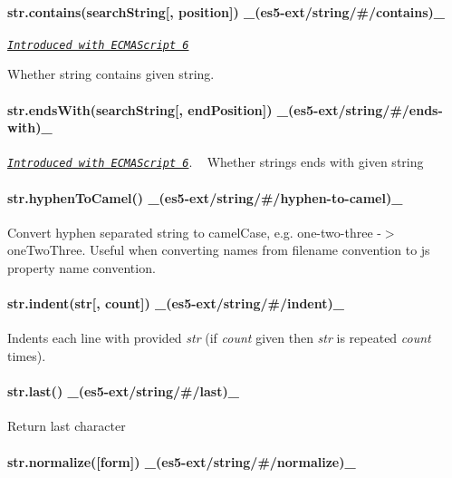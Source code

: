 \paragraph*{str.\+contains(search\+String\mbox{[}, position\mbox{]}) \+\_\+(es5-\/ext/string/\#/contains)\+\_\+}

\href{http://people.mozilla.org/~jorendorff/es6-draft.html#sec-string.prototype.contains}{\tt {\itshape Introduced with E\+C\+M\+A\+Script 6}}

Whether string contains given string.

\paragraph*{str.\+ends\+With(search\+String\mbox{[}, end\+Position\mbox{]}) \+\_\+(es5-\/ext/string/\#/ends-\/with)\+\_\+}

\href{http://people.mozilla.org/~jorendorff/es6-draft.html#sec-string.prototype.endswith}{\tt {\itshape Introduced with E\+C\+M\+A\+Script 6}}. ~\newline
Whether strings ends with given string

\paragraph*{str.\+hyphen\+To\+Camel() \+\_\+(es5-\/ext/string/\#/hyphen-\/to-\/camel)\+\_\+}

Convert hyphen separated string to camel\+Case, e.\+g. one-\/two-\/three -\/$>$ one\+Two\+Three. Useful when converting names from filename convention to js property name convention.

\paragraph*{str.\+indent(str\mbox{[}, count\mbox{]}) \+\_\+(es5-\/ext/string/\#/indent)\+\_\+}

Indents each line with provided {\itshape str} (if {\itshape count} given then {\itshape str} is repeated {\itshape count} times).

\paragraph*{str.\+last() \+\_\+(es5-\/ext/string/\#/last)\+\_\+}

Return last character

\paragraph*{str.\+normalize(\mbox{[}form\mbox{]}) \+\_\+(es5-\/ext/string/\#/normalize)\+\_\+}

